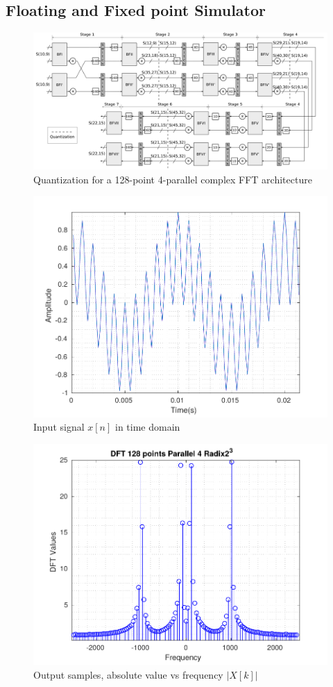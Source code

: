 \documentclass[journal,comsoc]{IEEEtran}
\begin{document}
\subsection{Floating and Fixed point Simulator}
\begin{figure}[t!]
	\centering
	\includegraphics[width=0.90\linewidth]{Diagramas/folding-128-quant.png}
	\caption{Quantization for a 128-point 4-parallel complex FFT architecture}
	\label{fig:4paralelo128pradix8cuantizacion1}
\end{figure}
\begin{figure}[t!]
	\centering
	\includegraphics[width=0.92\linewidth]{Diagramas/DftInputSignal.pdf}
	\caption{Input signal $x[n]$ in time domain}
	\label{fig:dftinputsignal}
\end{figure}
\begin{figure}[t!]
	\centering
	\includegraphics[width=0.95\linewidth]{Diagramas/DftFixedPoint.pdf}
	\caption{Output samples, absolute value vs frequency $|X[k]|$}
	\label{fig:dftfixedpoint}
\end{figure}
\end{document}

